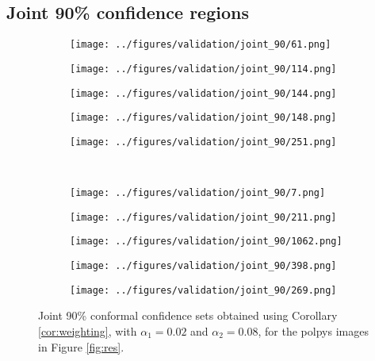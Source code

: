 \subsection{Joint 90\% confidence regions}
\begin{figure}[h!]
	\begin{subfigure}{0.19\textwidth}
		\centering
		\texttt{[image: ../figures/validation/joint\_90/61.png]}
		\label{fig:1}
	\end{subfigure}
	\begin{subfigure}{0.19\textwidth}
		\centering
		\texttt{[image: ../figures/validation/joint\_90/114.png]}
		\label{fig:1}
	\end{subfigure}
	\begin{subfigure}{0.19\textwidth}
		\centering
		\texttt{[image: ../figures/validation/joint\_90/144.png]}
		\label{fig:1}
	\end{subfigure}
	\begin{subfigure}{0.19\textwidth}
		\centering
		\texttt{[image: ../figures/validation/joint\_90/148.png]}
		\label{fig:1}
	\end{subfigure}
	\begin{subfigure}{0.19\textwidth}
		\centering
		\texttt{[image: ../figures/validation/joint\_90/251.png]}
		\label{fig:1}
	\end{subfigure}
	\vspace{-0.35cm}
	\\
	\begin{subfigure}{0.19\textwidth}
		\centering
		\texttt{[image: ../figures/validation/joint\_90/7.png]}
		\label{fig:1}
	\end{subfigure}
	\begin{subfigure}{0.19\textwidth}
		\centering
		\texttt{[image: ../figures/validation/joint\_90/211.png]}
		\label{fig:1}
	\end{subfigure}
	\begin{subfigure}{0.19\textwidth}
		\centering
		\texttt{[image: ../figures/validation/joint\_90/1062.png]}
		\label{fig:1}
	\end{subfigure}
	\begin{subfigure}{0.19\textwidth}
		\centering
		\texttt{[image: ../figures/validation/joint\_90/398.png]}
		\label{fig:1}
	\end{subfigure}
	\begin{subfigure}{0.19\textwidth}
		\centering
		\texttt{[image: ../figures/validation/joint\_90/269.png]}
		\label{fig:1}
	\end{subfigure}
	\label{fig:grid}
	\caption{Joint 90\% conformal confidence sets obtained using Corollary \ref{cor:weighting}, with $\alpha_1 = 0.02$ and $\alpha_2 = 0.08$, for the polpys images in Figure \ref{fig:res}.}\label{fig:joint}
\end{figure}
\newpage
